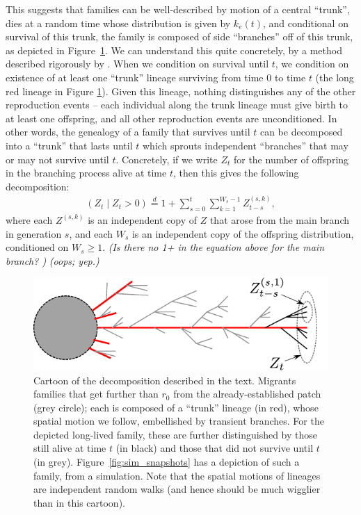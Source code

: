 \documentclass{article}
\renewcommand{\P}{\mathbb{P}}
\newcommand{\deq}{\stackrel{\scriptscriptstyle{d}}{=}}
\newcommand{\gc}[1]{{\it\color{green}(#1)} }
\newcommand{\plr}[1]{{\it\color{blue}(#1)}}
\begin{document}
This suggests that families can be well-described by motion of a central ``trunk'',
dies at a random time whose distribution is given by $k_e(t)$,
and conditional on survival of this trunk, the family is composed of side ``branches'' off of this trunk,
as depicted in Figure~\ref{fig:branching_decomp}.
We can understand this quite concretely, by a method described rigorously by \citet{geiger1999elementary} \citep[see also][]{chauvin1991growing}.
When we condition on survival until $t$, we condition on existence of
at least one ``trunk'' lineage surviving from time $0$ to time $t$ (the long red
lineage in Figure \ref{fig:branching_decomp}).
Given this lineage, nothing distinguishes any of the other reproduction events --
each individual along the trunk lineage must give birth to at least one offspring,
and all other reproduction events are unconditioned.
In other words, the genealogy of a family that survives until $t$
can be decomposed into a ``trunk'' that lasts until $t$
which sprouts independent ``branches'' that may or may not survive until $t$.
Concretely, if we write $Z_t$ for the number of offspring in the branching process alive at time $t$,
then this gives the following decomposition:
\begin{align}
  \left( Z_t \; \vert \; Z_t>0 \right) \deq 1 + \sum_{s=0}^t \sum_{k=1}^{W_s-1} Z^{(s,k)}_{t-s},
\end{align}
where each $Z^{(s,k)}$ is an independent copy of $Z$ 
that arose from the main branch in generation $s$,
and each $W_s$ is an independent copy of the offspring distribution, conditioned on $W_s \ge 1$.
\gc{Is there no 1+ in the equation above for the main branch? } \plr{oops; yep.}


\begin{figure}[ht!!]
  \begin{center}
    \includegraphics{branching-concept}
  \end{center}
\caption{Cartoon of the decomposition described in the text. 
Migrants families that get further than $r_0$ from the already-established patch (grey circle);
each is composed of a ``trunk'' lineage (in red), whose spatial motion we follow,
embellished by transient branches.
For the depicted long-lived family, these are further distinguished by those still alive at time $t$ (in black)
and those that did not survive until $t$ (in grey).
Figure~\ref{fig:sim_snapshots} has a depiction of such a family, from a simulation. 
Note that the spatial motions of lineages are independent random walks
(and hence should be much wigglier than in this cartoon).
} \label{fig:branching_decomp}
\end{figure}
\end{document}
